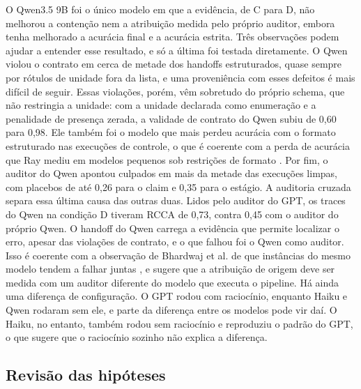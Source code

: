 O Qwen3.5 9B foi o único modelo em que a evidência, de C para D, não melhorou a contenção nem a atribuição medida pelo próprio auditor, embora tenha melhorado a acurácia final e a acurácia estrita.
Três observações podem ajudar a entender esse resultado, e só a última foi testada diretamente.
O Qwen violou o contrato em cerca de metade dos handoffs estruturados, quase sempre por rótulos de unidade fora da lista, e uma proveniência com esses defeitos é mais difícil de seguir. Essas violações, porém, vêm sobretudo do próprio schema, que não restringia a unidade: com a unidade declarada como enumeração e a penalidade de presença zerada, a validade de contrato do Qwen subiu de 0,60 para 0,98.
Ele também foi o modelo que mais perdeu acurácia com o formato estruturado nas execuções de controle, o que é coerente com a perda de acurácia que Ray mediu em modelos pequenos sob restrições de formato \cite{ray2026constraint}.
Por fim, o auditor do Qwen apontou culpados em mais da metade das execuções limpas, com placebos de até 0,26 para o claim e 0,35 para o estágio.
A auditoria cruzada separa essa última causa das outras duas. Lidos pelo auditor do GPT, os traces do Qwen na condição D tiveram RCCA de 0,73, contra 0,45 com o auditor do próprio Qwen. O handoff do Qwen carrega a evidência que permite localizar o erro, apesar das violações de contrato, e o que falhou foi o Qwen como auditor. Isso é coerente com a observação de Bhardwaj et al. de que instâncias do mesmo modelo tendem a falhar juntas \cite{bhardwaj2026contracts}, e sugere que a atribuição de origem deve ser medida com um auditor diferente do modelo que executa o pipeline.
Há ainda uma diferença de configuração. O GPT rodou com raciocínio, enquanto Haiku e Qwen rodaram sem ele, e parte da diferença entre os modelos pode vir daí. O Haiku, no entanto, também rodou sem raciocínio e reproduziu o padrão do GPT, o que sugere que o raciocínio sozinho não explica a diferença.

\subsection{Revisão das hipóteses}\label{sec:disc-hipoteses}

